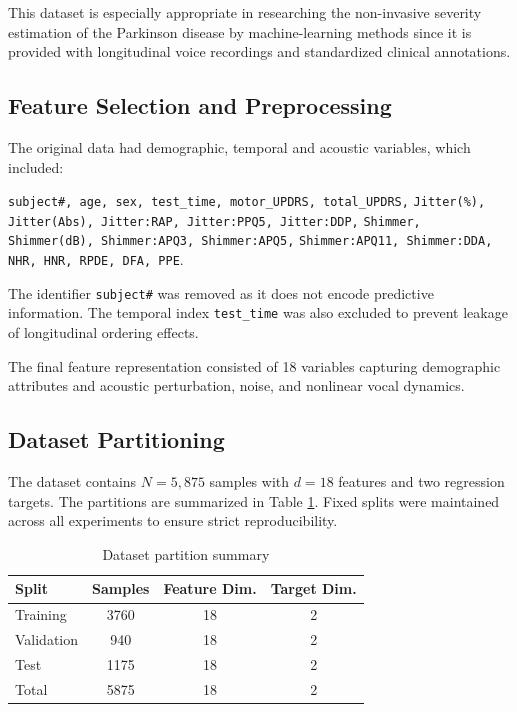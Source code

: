\documentclass{customIEEEsingle}
\begin{document}
	This dataset is especially appropriate in researching the non-invasive severity estimation of the Parkinson disease by machine-learning methods since it is provided with longitudinal voice recordings and standardized clinical annotations.
	
	\subsection{Feature Selection and Preprocessing}
	
	The original data had demographic, temporal and acoustic variables, which included:
	
	\texttt{subject\#, age, sex, test\_time, motor\_UPDRS, total\_UPDRS,}
	\texttt{Jitter(\%), Jitter(Abs), Jitter:RAP, Jitter:PPQ5, Jitter:DDP,}
	\texttt{Shimmer, Shimmer(dB), Shimmer:APQ3, Shimmer:APQ5,}
	\texttt{Shimmer:APQ11, Shimmer:DDA, NHR, HNR, RPDE, DFA, PPE}.
	
	The identifier \texttt{subject\#} was removed as it does not encode predictive information. The temporal index \texttt{test\_time} was also excluded to prevent leakage of longitudinal ordering effects. 
	
	The final feature representation consisted of 18 variables capturing demographic attributes and acoustic perturbation, noise, and nonlinear vocal dynamics.
	
	\subsection{Dataset Partitioning}
	
	The dataset contains $N = 5{,}875$ samples with $d = 18$ features and two regression targets. The partitions are summarized in Table \ref{tab:data_splits}. Fixed splits were maintained across all experiments to ensure strict reproducibility.
	
	\begin{table}[htbp]
		\centering
		\caption{Dataset partition summary}
		\label{tab:data_splits}
		\begin{tabular}{|l|c|c|c|}
			\hline
			Split & Samples & Feature Dim. & Target Dim. \\
			\hline
			Training & 3760 & 18 & 2 \\
			Validation & 940 & 18 & 2 \\
			Test & 1175 & 18 & 2 \\
			\hline
			Total & 5875 & 18 & 2 \\
			\hline
		\end{tabular}
	\end{table}
	
\end{document}
